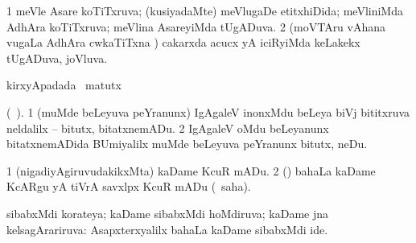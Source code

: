 {\bentry
{} 
\gl{\gu}
\expl{}
\bmng
\bnum
\num{1} meVle Asare koTiTxruva; (kusiyadaMte) meVlugaDe etitxhiDida; meVliniMda AdhAra koTiTxruva; meVlina AsareyiMda tUgADuva. 
\num{2} (moVTAru vAhana \mo vugaLa AdhAra cwkaTiTxna \vi) cakarxda acucx yA iciRyiMda keLakekx tUgADuva, joVluva. 
\enum
\emng
\eentry

\bentry
{} 
\gl{\kirx}
\expl{}
\bmng
  kirxyApadada \BU\ matutx \BUkaq\ \rUpa 
\emng
\eentry

\bentry
{} 
\gl{\sakirx}
\expl{}
\bmng
 (\BUkaq\ ). 
\bnum
\num{1} (muMde beLeyuva peYranunx) IgAgaleV inonxMdu beLeya biVj bititxruva neldalilx -- bitutx, bitatxnemADu. 
\num{2} IgAgaleV oMdu beLeyanunx bitatxnemADida BUmiyalilx muMde beLeyuva peYranunx bitutx, neDu. 
\enum
\emng
\eentry

\bentry
{} 
\gl{\sakirx}
\bmng
\bnum
\num{1} (nigadiyAgiruvudakikxMta) kaDame KcuR mADu. 
\num{2} (\AtAmx) bahaLa kaDame KcARgu yA tiVrA savxlpx KcuR mADu (\akirx\ saha). 
\enum
\emng
\eentry

\bentry
{} 
\gl{\gu}
\expl{}
\bmng
 sibabxMdi korateya; kaDame sibabxMdi hoMdiruva; kaDame jna kelsagArariruva:  Asapxterxyalilx bahaLa kaDame sibabxMdi ide. 
\emng
\eentry

\bentry
{} 
\gl{\kirx}


}
